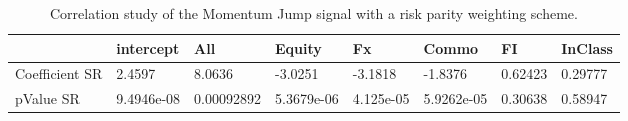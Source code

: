 \begin{table}[H]
\centering
\begin{tabular}{llllllll}
& intercept & All & Equity & Fx & Commo & FI & InClass \\ 
\hline 
Coefficient SR & 2.4597 & 8.0636 & -3.0251 & -3.1818 & -1.8376 & 0.62423 & 0.29777 \\ 
pValue SR & 9.4946e-08 & 0.00092892 & 5.3679e-06 & 4.125e-05 & 5.9262e-05 & 0.30638 & 0.58947 \\ 
\hline
\end{tabular}
\caption{Correlation study of the Momentum Jump signal with a risk parity weighting scheme.}
\label{MOMJUMPRP_CORR}
\end{table}